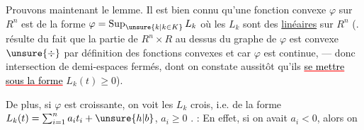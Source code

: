 Prouvons maintenant le lemme. Il est bien connu qu'une  fonction convexe  $\varphi$ sur $R^n$ est de la forme $\varphi=\operatorname*{Sup}_{\unsure{k|k\in K}}L_k$ où les $L_k$ sont des  \uline{linéaires}  sur $R^n$ (. résulte du fait que la partie de $R^n\times R$ au dessus du graphe de $\varphi$ est convexe $\unsure{\div}$ par définition des fonctions convexes et  car $\varphi$ est continue, --- donc intersection de demi-espaces fermés, dont on constate aussitôt
\reversemarginpar
{}
\normalmarginpar
qu'ils  \textcolor{red}{\uline{\textcolor{black}{ se mettre}}} \textcolor{red}{\uline{\textcolor{black}{sous la forme}}}  $L_k(t)\geq0$).

De plus, si $\varphi$ est croissante, on voit  les $L_k$ crois, i.e.  de la forme $L_k(t)=\sum_{i=1}^n a_it_i+\unsure{h|b}$,  $a_i\geq0$ .  : En effet, si on avait $a_i<0$, alors  on

\reversemarginpar
{}
\normalmarginpar
